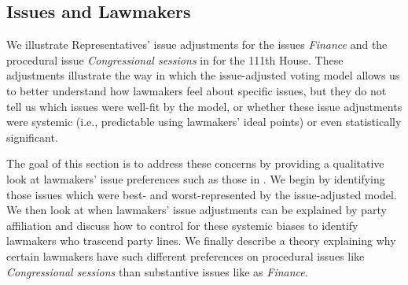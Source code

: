 

\subsection{Issues and Lawmakers}

\label{section:lawmakers}
\label{section:issues}

We illustrate Representatives' issue adjustments for the issues
\emph{Finance} and the procedural issue \emph{Congressional sessions}
in  for the 111th House.  These
adjustments illustrate the way in which the issue-adjusted voting
model allows us to better understand how lawmakers feel about specific
issues, but they do not tell us which issues were well-fit by the
model, or whether these issue adjustments were systemic (i.e.,
predictable using lawmakers' ideal points) or even statistically
significant.

The goal of this section is to address these concerns by providing a
qualitative look at lawmakers' issue preferences such as those in
.  We begin by identifying those
issues which were best- and worst-represented by the issue-adjusted
model.  We then look at when lawmakers' issue adjustments can be
explained by party affiliation and discuss how to control for these
systemic biases to identify lawmakers who trascend party lines.  We
finally describe a theory explaining why certain lawmakers have such
different preferences on procedural issues like \emph{Congressional
  sessions} than substantive issues like as \emph{Finance}.

